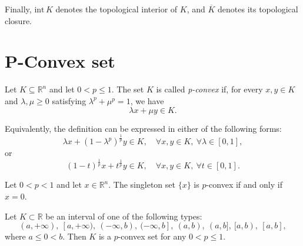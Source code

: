 \documentclass[10pt]{article}
\begin{document}
Finally, $\mathrm{int}\, K$ denotes the topological interior of $K$, and $\overline{K}$ denotes its topological closure.

 \section{P-Convex set}
\begin{definition} 
Let $K \subseteq \mathbb{R}^n$ and let $0 < p \leq 1$. The set $K$ is called \emph{p-convex} if, for every $x, y \in K$ and $\lambda, \mu \geq 0$ satisfying $\lambda^p + \mu^p = 1$, we have
\[
\lambda x + \mu y \in K.
\]

Equivalently, the definition can be expressed in either of the following forms:
\[
\lambda x + (1 - \lambda^p)^{\frac{1}{p}} y \in K, \quad \forall x, y \in K, \ \forall \lambda \in [0,1],
\]
or
\[
(1 - t)^{\frac{1}{p}} x + t^{\frac{1}{p}} y \in K, \quad \forall x, y \in K, \ \forall t \in [0,1].
\]

\end{definition}

\begin{remark} Let $0<p<1$ and let $x \in \mathbb{R}^n$. The singleton set $\{x\}$ is $p$-convex if and only if $x=0$.
\end{remark}

\begin{proposition}
Let $K \subset \mathbb{R}$ be an interval of one of the following types:
\[
(a,+\infty),\ [a,+\infty),\ (-\infty,b),\ (-\infty,b],\ (a,b),\ (a,b],\ [a,b),\ [a,b],
\]
where $a \le 0 < b$. Then $K$ is a $p$-convex set for any $0<p\le1$.
\end{proposition}
\end{document}

